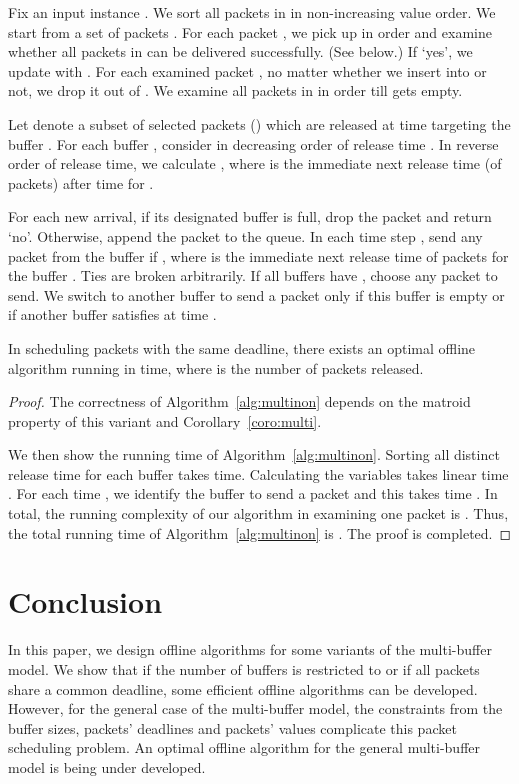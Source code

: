 \documentclass[final, 11pt]{article}
\begin{document}
\begin{algorithm}
Fix an input instance . We sort all packets in  in non-increasing value order. We start from a set of packets . For each packet , we pick up  in order and examine whether all packets in  can be delivered successfully. (See below.) If `yes', we update  with . For each examined packet , no matter whether we insert  into  or not, we drop it out of . We examine all packets in  in order till  gets empty.

Let  denote a subset of selected packets () which are released at time  targeting the buffer . For each buffer , consider  in decreasing order of release time . In reverse order of release time, we calculate , where  is the immediate next release time (of packets) after time  for .

For each new arrival, if its designated buffer is full, drop the packet and return `no'. Otherwise, append the packet to the queue. In each time step , send any packet from the buffer  if , where  is the immediate next release time of packets for the buffer . Ties are broken arbitrarily. If all buffers  have , choose any packet to send. We switch to another buffer to send a packet only if this buffer is empty or if another buffer  satisfies  at time .
\label{alg:multinon}
\end{algorithm}

\begin{theorem}
In scheduling packets with the same deadline, there exists an optimal offline algorithm running in  time, where  is the number of packets released.
\label{theorem:nonuniformoff}
\end{theorem}

\begin{proof}
The correctness of Algorithm~\ref{alg:multinon} depends on the matroid property of this variant and Corollary~\ref{coro:multi}.

We then show the running time of Algorithm~\ref{alg:multinon}. Sorting all distinct release time for each buffer takes  time. Calculating the variables  takes linear time . For each time , we identify the buffer to send a packet and this takes time . In total, the running complexity of our algorithm in examining one packet is . Thus, the total running time of Algorithm~\ref{alg:multinon} is . The proof is completed. 
\end{proof}


\section{Conclusion}

In this paper, we design offline algorithms for some variants of the multi-buffer model. We show that if the number of buffers is restricted to  or if all packets share a common deadline, some efficient offline algorithms can be developed. However, for the general case of the multi-buffer model, the constraints from the buffer sizes, packets' deadlines and packets' values complicate this packet scheduling problem. An optimal offline algorithm for the general multi-buffer model is being under developed.




\end{document}
